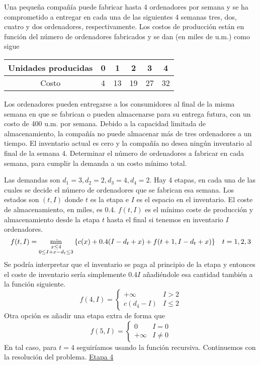 \documentclass[twoside]{article}
\begin{document}
\newpage 
\begin{ejercicio}{3}
Una pequeña compañía puede fabricar hasta 4 ordenadores por semana y se ha comprometido
a entregar en cada una de las siguientes 4 semanas tres, dos, cuatro y dos ordenadores, respectivamente.
Los costos de producción están en función del número de ordenadores fabricados y se dan
(en miles de u.m.) como sigue
\begin{center}
\begin{tabular}{c| c c c c c}
Unidades producidas & 0 & 1 & 2 & 3 & 4 \\
\hline
Costo & 4 & 13 & 19 & 27 & 32
\end{tabular}
\end{center}
Los ordenadores pueden entregarse a los consumidores al final de la misma semana en que se
fabrican o pueden almacenarse para su entrega futura, con un costo de 400 u.m. por semana.
Debido a la capacidad limitada de almacenamiento, la compañía no puede almacenar más de tres
ordenadores a un tiempo. El inventario actual es cero y la compañía no desea ningún inventario
al final de la semana 4. Determinar el número de ordenadores a fabricar en cada semana, para
cumplir la demanda a un costo mínimo total.
\begin{solucion}
Las demandas son $d_1=3, d_2=2, d_3=4, d_4=2$. Hay 4 etapas, en cada una de las cuales se decide el número de ordenadores que se fabrican esa semana. Los estados son $(t, I)$ donde $t$ es la etapa e $I$ es el espacio en el inventario. El coste de almacenamiento, en miles, es 0.4. $f(t,I)$ es el mínimo coste de producción y almacenamiento desde la etapa $t$ hasta el final si tenemos en inventario $I$ ordenadores.
$$f(t,I)=\min_{\substack{x\leq 4\\ 0\leq I+x-d_t\leq 3}}{\left\{c(x)+0.4(I-d_t+x)+f(t+1,I-d_t+x)\right\}}\quad t=1,2,3$$
Se podría interpretar que el inventario se paga al principio de la etapa y entonces el coste de inventario sería simplemente $0.4I$ añadiéndole esa cantidad también a la función siguiente. 
$$f(4,I)=\begin{cases}
+\infty & I>2\\
c(d_4-I) & I\leq 2
\end{cases}$$
Otra opción es añadir una etapa extra de forma que 
$$f(5,I)=\begin{cases}
0 & I=0\\
+\infty & I\neq 0
\end{cases}$$
En tal caso, para $t=4$ seguiríamos usando la función recursiva. Continuemos con la resolución del problema.
\newpage
\underline{Etapa 4}

\end{solucion}
\end{ejercicio}
\end{document}
